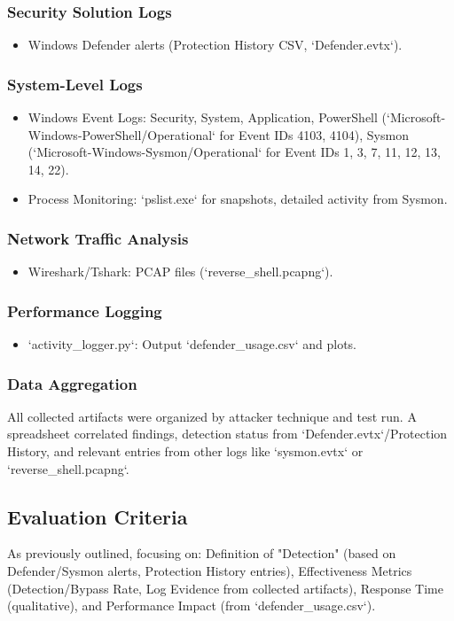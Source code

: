 \documentclass[11pt]{article}
\begin{document}
	\subsubsection{Security Solution Logs}
	\begin{itemize}
		\item Windows Defender alerts (Protection History CSV, `Defender.evtx`).
	\end{itemize}
	\subsubsection{System-Level Logs}
	\begin{itemize}
		\item Windows Event Logs: Security, System, Application, PowerShell (`Microsoft-Windows-PowerShell/Operational` for Event IDs 4103, 4104), Sysmon (`Microsoft-Windows-Sysmon/Operational` for Event IDs 1, 3, 7, 11, 12, 13, 14, 22).
		\item Process Monitoring: `pslist.exe` for snapshots, detailed activity from Sysmon.
	\end{itemize}
	\subsubsection{Network Traffic Analysis}
	\begin{itemize}
		\item Wireshark/Tshark: PCAP files (`reverse_shell.pcapng`).
	\end{itemize}
	\subsubsection{Performance Logging}
	\begin{itemize}
		\item `activity_logger.py`: Output `defender_usage.csv` and plots.
	\end{itemize}
	\subsubsection{Data Aggregation}
	All collected artifacts were organized by attacker technique and test run. A spreadsheet correlated findings, detection status from `Defender.evtx`/Protection History, and relevant entries from other logs like `sysmon.evtx` or `reverse_shell.pcapng`.
	
	\subsection{Evaluation Criteria}
	As previously outlined, focusing on: Definition of "Detection" (based on Defender/Sysmon alerts, Protection History entries), Effectiveness Metrics (Detection/Bypass Rate, Log Evidence from collected artifacts), Response Time (qualitative), and Performance Impact (from `defender_usage.csv`).
	\newpage
	
\end{document}
